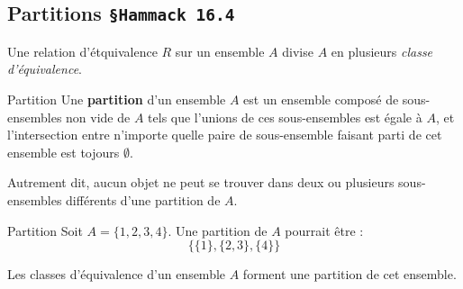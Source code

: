 \documentclass[16pt]{report}
\begin{document}
\begin{multicols*}{2}
            \section{Partitions \texttt{\small{\S Hammack 16.4}}}
            Une relation d'étquivalence $R$ sur un ensemble $A$ divise $A$ en plusieurs  
            \textit{classe d'équivalence}. 

            \begin{Definitionx}{Partition}{}
                Une \textbf{partition} d'un ensemble $A$ est un ensemble composé de sous-ensembles non vide 
                de $A$ tels que l'unions de ces sous-ensembles est égale à $A$, et l'intersection 
                entre n'importe quelle paire de sous-ensemble faisant parti de cet ensemble est tojours $\emptyset$. 
            \end{Definitionx}

            Autrement dit, aucun objet ne peut se trouver dans deux ou plusieurs sous-ensembles différents 
            d'une partition de $A$. 


            \begin{EExample}{Partition}{}
                Soit $A = \{1, 2, 3, 4\}$. Une partition de $A$ pourrait être : 
                \[ \bigl\{ \{1\}, \{2,3\}, \{4\} \bigr\} \]
            \end{EExample}


            \begin{Theorem}{}{}
                Les classes d'équivalence d'un ensemble $A$ forment une partition de cet ensemble. 
            \end{Theorem}



\end{multicols*}
\end{document}
